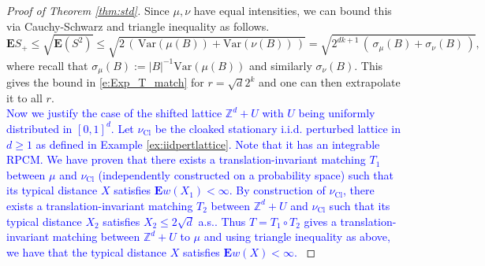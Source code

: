 \documentclass[12pt]{article}
\newcommand{\C}{ {\mathsf C}}
\newcommand{\1}{\mathbf{1}}
\newcommand{\tmu}{\tilde{\mu}}
\newcommand{\nupl}{\nu_{\textrm{Cl}}}
\newcommand{\E}{\mathbf  E}
\newcommand{\var}{\text{Var}}
\newcommand{\RL}[1]{\textcolor{blue}{#1}}
\newcommand{\dy}[1]{\textcolor{blue}{#1}}
\newcommand{\RL}[1]{#1}%
\newcommand{\dy}[1]{#1}%
\renewcommand{\footnote}[1]{}
\begin{document}
{{{{{\begin{proof}[Proof of Theorem \ref{thm:std}]
{%
Since $\mu,\nu$ have equal intensities, we can bound this via Cauchy-Schwarz and triangle inequality as follows.
%
$$ \mathbf{E}S_{+} \leqslant  \sqrt{\mathbf{E}(S^2)} \leqslant  \sqrt{2 \, (\, \var(\mu(B))+\var(\nu(B)) \, )} = \sqrt{2^{dk+1} \, ( \, \sigma_{\mu}(B) + \sigma_{\nu}(B) \, )},$$
%
where recall that  $\sigma_{\mu}(B) := |B|^{-1}\var(\mu(B))$ and similarly $\sigma_{\nu}(B)$. This gives the bound in \eqref{e:Exp_T_match} for $r = \sqrt{d}2^k$  and one can then extrapolate it to all $r$.}\\


\dy{ Now we justify the case of the shifted lattice $\mathbb{Z}^d + U$ with $U$ being uniformly distributed in $[0,1]^d$. Let $\nupl$ be the \RL{cloaked} stationary i.i.d. perturbed lattice in $d \geq 1$ as defined in Example \ref{ex:iidpertlattice}. Note that it has an integrable RPCM. We have proven that there exists a translation-invariant matching $T_1$ between $\mu$ and $\nupl$ (independently constructed on a probability space) such that its  typical distance $X$ satisfies $ \mathbf E w(X_1) < \infty $. By construction of $\nupl$, there exists a translation-invariant matching $T_2$ between $\mathbb{Z}^d + U$ and $\nupl$ such that its typical distance $X_2$ satisfies $X_2 \leq 2\sqrt{d}$ a.s.. Thus $T = T_1 \circ T_2$ gives a translation-invariant matching between $\mathbb{Z}^d + U$ to $\mu$ and using triangle inequality as above, we have that the typical distance $X$ satisfies $ \mathbf E w(X) < \infty $. }
\end{proof}
%



}}}}}
\end{document}
